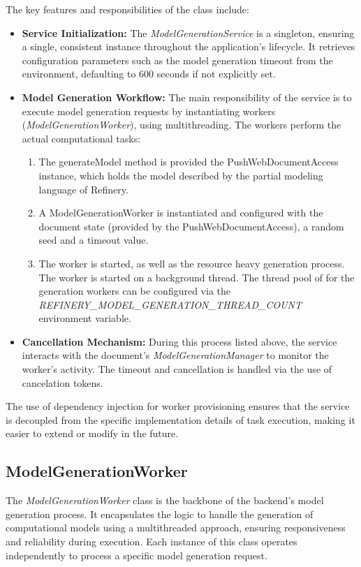 			The key features and responsibilities of the class include:
			\begin{itemize}
				\item{\textbf{Service Initialization:}} The \textit{ModelGenerationService} is a singleton, 
				ensuring a single, consistent instance throughout the application's lifecycle.
				It retrieves configuration parameters such as the model generation timeout 
				from the environment, defaulting to 600 seconds if not explicitly set.
				\item{\textbf{Model Generation Workflow:}} The main responsibility of the service is to execute model generation requests 
				by instantiating workers (\textit{ModelGenerationWorker}), using multithreading. 
				The workers perform the actual computational tasks:
				\begin{enumerate}
					\item The generateModel method is provided the PushWebDocumentAccess instance, which holds the model described by the partial modeling language
					of Refinery.
					\item A ModelGenerationWorker is instantiated and configured with the document state (provided by the PushWebDocumentAccess), 
					a random seed and a timeout value.
					\item The worker is started, as well as the resource heavy generation process. 
					The worker is started on a background thread. 
					The thread pool of for the generation workers can be configured via the 
					\textit{REFINERY\_MODEL\_GENERATION\_THREAD\_COUNT} environment variable.
				\end{enumerate}
				\item{\textbf{Cancellation Mechanism:}}
				During this process listed above, the service interacts with the document’s \textit{ModelGenerationManager} to monitor the worker's activity.
				The timeout and cancellation is handled via the use of cancelation tokens.
			\end{itemize}
			The use of dependency injection for worker provisioning ensures that the service is decoupled from the specific implementation details of task execution, making it easier to extend or modify in the future.

		\subsection{ModelGenerationWorker}
			The \textit{ModelGenerationWorker} class is the backbone of the backend’s model generation process. 
			It encapsulates the logic to handle the generation of computational models using a multithreaded approach, 
			ensuring responsiveness and reliability during execution. 
			Each instance of this class operates independently to process a specific model generation request.	

